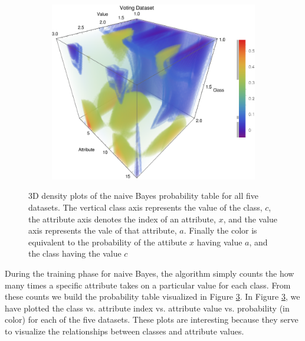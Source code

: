 \documentclass{article}
\begin{document}
\begin{figure}[h!]
\begin{subfigure}[b]{0.4\textwidth}
				\caption{}
				\label{p_soybean}				
			\end{subfigure} \	
			\begin{subfigure}[b]{0.4\textwidth}
				\centering
				\includegraphics[width=\textwidth]{figs/NaiveBayes/plot_ptable_vote}	
				\caption{}
				\label{p_vote}				
			\end{subfigure}
			\caption{3D density plots of the naive Bayes probability table for all five datasets. The vertical class axis represents the value of the class, $c$, the attribute axis denotes the index of an attribute, $x$, and the value axis represents the vale of that attribute, $a$. Finally the color is equivalent to the probability of the attibute $x$ having value $a$, and the class having the value $c$}
			\label{ptable}
		\end{figure}
			
		During the training phase for naive Bayes, the algorithm simply counts the how many times a specific attribute takes on a particular value for each class. 
		From these counts we build the probability table visualized in Figure \ref{ptable}. 
		In Figure \ref{ptable}, we have plotted the class vs. attribute index vs. attribute value vs. probability (in color) for each of the five datasets. 
		These plots are interesting because they serve to visualize the relationships between classes and attribute values. 
			
\end{document}
